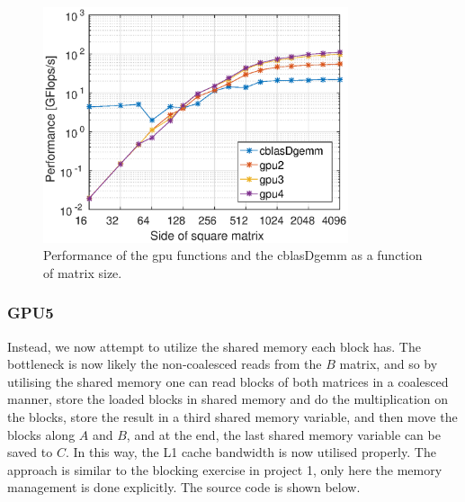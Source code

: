 \begin{figure}
\centering
\includegraphics[width = 0.8\textwidth]{fig/gpu4.eps}
\caption{Performance of the gpu functions and the cblasDgemm as a function of matrix size.}
\label{fig:gpu4}
\end{figure}


\subsubsection{GPU5}
Instead, we now attempt to utilize the shared memory each block has. The bottleneck is now likely the non-coalesced reads from the $B$ matrix, and so by utilising the shared memory one can read blocks of both matrices in a coalesced manner, store the loaded blocks in shared memory and do the multiplication on the blocks, store the result in a third shared memory variable, and then move the blocks along $A$ and $B$, and at the end, the last shared memory variable can be saved to $C$. In this way, the L1 cache bandwidth is now utilised properly. The approach is similar to the blocking exercise in project 1, only here the memory management is done explicitly. The source code is shown below.

